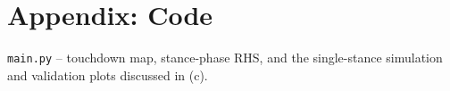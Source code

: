 \documentclass[10pt]{article}
\begin{document}
\normalsize

\appendix
\section*{Appendix: Code}
\texttt{main.py} -- touchdown map, stance-phase RHS, and the
single-stance simulation and validation plots discussed in (c).

\end{document}
